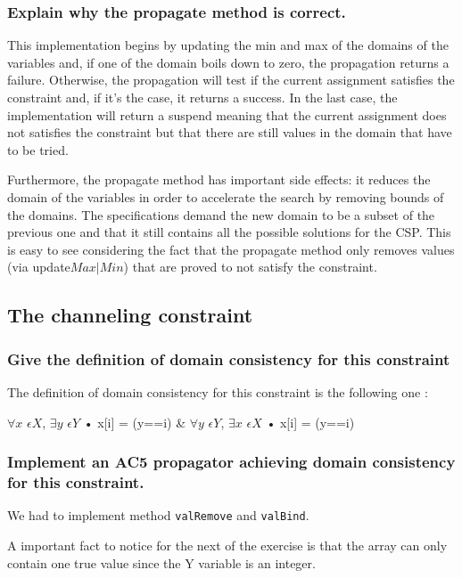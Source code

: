 \documentclass[a4paper ,12pt,french]{article}
\begin{document}
\subsubsection{Explain why the propagate method is correct.}
This implementation begins by updating the min and max of the domains of the variables and, if one of the domain boils down to zero, the propagation returns a failure. Otherwise, the propagation will test if the current assignment satisfies the constraint and, if it's the case, it returns a success. 
In the last case, the implementation will return a suspend meaning that the current assignment does not satisfies the constraint but that there are still values in the domain that have to be tried. 

Furthermore, the propagate method has important side effects: it reduces the domain of the variables in order to accelerate the search by removing bounds of the domains. The specifications demand the new domain to be a subset of the previous one and that it still contains all the possible solutions for the CSP. This is easy to see considering the fact that the propagate method only removes values (via update$Max\vert Min$) that are proved to not satisfy the constraint.


\subsection{The channeling constraint}
\subsubsection{Give the definition of domain consistency for this constraint}
The definition of domain consistency for this constraint is the following one :
\begin{center}
$\forall x$ $\epsilon X$, $\exists y$ $\epsilon Y$ • x[i] = (y==i) \& $\forall y$ $\epsilon Y$, $\exists x$ $\epsilon X$ • x[i] = (y==i)\\
\end{center} 



\subsubsection{Implement an AC5 propagator achieving domain consistency for this constraint.}
We had to implement method \texttt{valRemove} and \texttt{valBind}.

A important fact to notice for the next of the exercise is that the array can only contain one true value since the Y variable is an integer.\\
\end{document}
